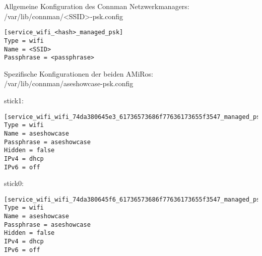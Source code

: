 Allgemeine Konfiguration des Connman Netzwerkmanagers:\\
/var/lib/connman/<SSID>-psk.config
\begin{lstlisting}
[service_wifi_<hash>_managed_psk]
Type = wifi
Name = <SSID>
Passphrase = <passphrase>
\end{lstlisting}

Spezifische Konfigurationen der beiden AMiRos:\\
/var/lib/connman/aseshowcase-psk.config

stick1:
\begin{lstlisting}
[service_wifi_wifi_74da380645e3_61736573686f77636173655f3547_managed_psk]
Type = wifi
Name = aseshowcase
Passphrase = aseshowcase
Hidden = false
IPv4 = dhcp
IPv6 = off
\end{lstlisting}

stick0:
\begin{lstlisting}
[service_wifi_wifi_74da380645f6_61736573686f77636173655f3547_managed_psk]
Type = wifi
Name = aseshowcase
Passphrase = aseshowcase
Hidden = false
IPv4 = dhcp
IPv6 = off
\end{lstlisting}

